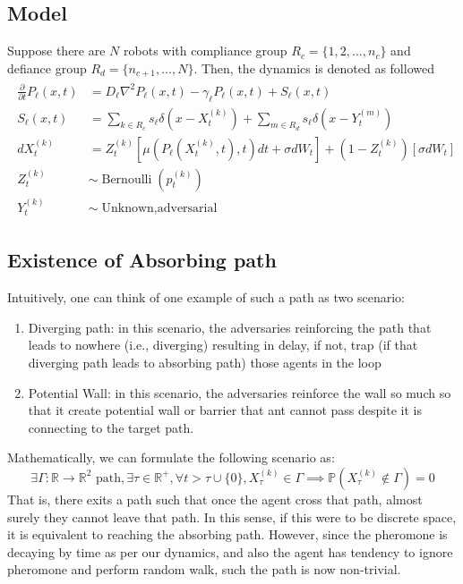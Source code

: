 \documentclass[12pt]{article}
\begin{document}
\subsection{Model}
Suppose there are $N$ robots with compliance group $R_c = \{1,2,\dots,n_c\}$ and defiance group $R_d = \{n_{c+1},\dots,N\}$. Then, the dynamics is denoted as followed
\begin{align}
\begin{split}
  \frac{\partial}{\partial t} P_{\ell}(x,t) &= D_\ell \nabla^2 P_\ell (x,t) - \gamma_\ell P_\ell(x,t) + S_{\ell}(x,t)\\
  S_\ell(x,t) &= \sum_{k\in R_c} s_\ell\delta(x-X_t^{(k)}) + \sum_{m\in R_d}s_\ell\delta(x-Y_t^{(m)})\\
  dX_t^{(k)} &= Z_t^{(k)}\left[\mu(P_\ell(X_t^{(k)},t),t)dt + \sigma dW_t\right] + (1-Z_t^{(k)})\left[\sigma dW_t\right]\\
  Z_t^{(k)} &\sim \operatorname{Bernoulli}(p^{(k)}_t)\\
  Y_t^{(k)} &\sim \operatorname{Unknown, adversarial}
  \end{split}
\end{align}
\subsection{Existence of Absorbing path}
Intuitively, one can think of one example of such a path as two scenario:
\begin{enumerate}
    \item Diverging path: in this scenario, the adversaries reinforcing the path that leads to nowhere (i.e., diverging) resulting in delay, if not, trap (if that diverging path leads to absorbing path) those agents in the loop
    \item Potential Wall: in this scenario, the adversaries reinforce the wall so much so that it create potential wall or barrier that ant cannot pass despite it is connecting to the target path.
\end{enumerate}
Mathematically, we can formulate the following scenario as:
\begin{equation}
  \exists \Gamma : \mathbb{R} \rightarrow \mathbb{R}^2 \text{ path}, \exists \tau \in \mathbb{R}^{+},\forall t > \tau \cup \{0\}, X_\tau^{(k)}\in \Gamma \implies \mathbb{P}(X_\tau^{(k)}\not\in \Gamma) = 0
\end{equation}
That is, there exits a path such that once the agent cross that path, almost surely they cannot leave that path. In this sense, if this were to be discrete space, it is equivalent to reaching the absorbing path. However, since the pheromone is decaying by time as per our dynamics, and also the agent has tendency to ignore pheromone and perform random walk, such the path is now non-trivial.
\end{document}
